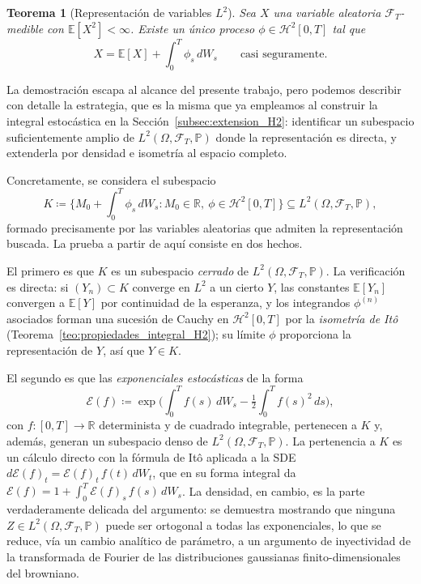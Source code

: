 \documentclass[11pt,a4paper,oneside]{report}
\theoremstyle{plain}
\newtheorem{teorema}{Teorema}[chapter]
\theoremstyle{definition}
\theoremstyle{remark}
\newcommand{\R}{\mathbb{R}}
\newcommand{\E}{\mathbb{E}}
\newcommand{\PP}{\mathbb{P}}
\newcommand{\F}{\mathcal{F}}
\newcommand{\1}{\mathbf{1}}
\newcommand{\eqdef}{\coloneqq}
\begin{document}
\begin{teorema}[Representación de variables $L^2$]
\label{teo:representacion_l2}
Sea $X$ una variable aleatoria $\F_T$-medible con $\E[X^2] < \infty$.
Existe un único proceso $\phi \in \mathcal{H}^2[0, T]$ tal que
\begin{equation}\label{eq:representacion_l2}
  X = \E[X] + \int_0^T \phi_s\, dW_s
  \qquad \text{casi seguramente}.
\end{equation}
\end{teorema}

La demostración escapa al alcance del presente trabajo, pero podemos
describir con detalle la estrategia, que es la misma que ya empleamos
al construir la integral estocástica en la
Sección~\ref{subsec:extension_H2}: identificar un subespacio
suficientemente amplio de $L^2(\Omega, \F_T, \PP)$ donde la
representación es directa, y extenderla por densidad e isometría al
espacio completo.

Concretamente, se considera el subespacio
\[
  K \eqdef \biggl\{ M_0 + \int_0^T \phi_s\, dW_s :
                    M_0 \in \R,\ \phi \in \mathcal{H}^2[0, T] \biggr\}
  \subseteq L^2(\Omega, \F_T, \PP),
\]
formado precisamente por las variables aleatorias que admiten la
representación buscada. La prueba a partir de aquí consiste en dos hechos.

El primero es que $K$ es un subespacio \emph{cerrado} de $L^2(\Omega,
\F_T, \PP)$. La verificación es directa: si $(Y_n) \subset K$
converge en $L^2$ a un cierto $Y$, las constantes $\E[Y_n]$ convergen
a $\E[Y]$ por continuidad de la esperanza, y los integrandos
$\phi^{(n)}$ asociados forman una sucesión de Cauchy en
$\mathcal{H}^2[0, T]$ por la \emph{isometría de It\^o}
(Teorema~\ref{teo:propiedades_integral_H2}); su límite $\phi$
proporciona la representación de $Y$, así que $Y \in K$.

El segundo es que las \emph{exponenciales estocásticas} de la forma
\begin{equation*}
  \mathcal{E}(f)
  \eqdef \exp\!\biggl(\int_0^T f(s)\, dW_s
                       - \tfrac{1}{2} \int_0^T f(s)^2\, ds\biggr),
\end{equation*}
con $f : [0, T] \to \R$ determinista y de cuadrado integrable,
pertenecen a $K$ y, además, generan un subespacio denso de
$L^2(\Omega, \F_T, \PP)$. La pertenencia a $K$ es un cálculo directo
con la fórmula de It\^o aplicada a la SDE $d\mathcal{E}(f)_t =
\mathcal{E}(f)_t\, f(t)\, dW_t$, que en su forma integral da
$\mathcal{E}(f) = 1 + \int_0^T \mathcal{E}(f)_s\, f(s)\, dW_s$. La
densidad, en cambio, es la parte verdaderamente delicada del
argumento: se demuestra mostrando que ninguna $Z \in L^2(\Omega,
\F_T, \PP)$ puede ser ortogonal a todas las exponenciales, lo que se
reduce, vía un cambio analítico de parámetro, a un argumento de
inyectividad de la transformada de Fourier de las distribuciones
gaussianas finito-dimensionales del browniano.
\end{document}
